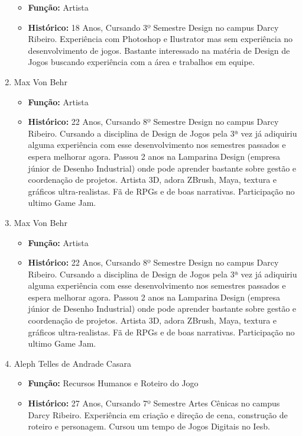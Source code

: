 \documentclass[a4paper, 11pt]{article} %
\begin{document}
\begin{enumerate}
\begin{itemize}
\item \textbf{Função:} Artista
\item \textbf{Histórico:} 18 Anos, Cursando 3º Semestre Design no campus Darcy Ribeiro. Experiência com Photoshop e Ilustrator mas sem experiência no desenvolvimento de jogos. Bastante interessado na matéria de Design de Jogos buscando experiência com a área e trabalhos em equipe.
\end{itemize}

\item Max Von Behr

\begin{itemize}
\item \textbf{Função:} Artista
\item \textbf{Histórico:} 22 Anos, Cursando 8º Semestre Design no campus Darcy Ribeiro. Cursando a disciplina de Design de Jogos pela 3ª vez já adiquiriu alguma experiência com esse desenvolvimento nos semestres passados e espera melhorar agora. Passou 2 anos na Lamparina Design (empresa júnior de Desenho Industrial) onde pode aprender bastante sobre gestão e coordenação de projetos. Artista 3D, adora ZBrush, Maya, textura e gráficos ultra-realistas. Fã de RPGs e de boas narrativas. Participação no ultimo Game Jam. 
\end{itemize}

\item Max Von Behr

\begin{itemize}
\item \textbf{Função:} Artista
\item \textbf{Histórico:} 22 Anos, Cursando 8º Semestre Design no campus Darcy Ribeiro. Cursando a disciplina de Design de Jogos pela 3ª vez já adiquiriu alguma experiência com esse desenvolvimento nos semestres passados e espera melhorar agora. Passou 2 anos na Lamparina Design (empresa júnior de Desenho Industrial) onde pode aprender bastante sobre gestão e coordenação de projetos. Artista 3D, adora ZBrush, Maya, textura e gráficos ultra-realistas. Fã de RPGs e de boas narrativas. Participação no ultimo Game Jam. 
\end{itemize}

\item Aleph Telles de Andrade Casara

\begin{itemize}
\item \textbf{Função:} Recursos Humanos e Roteiro do Jogo
\item \textbf{Histórico:} 27 Anos, Cursando 7º Semestre Artes Cênicas no campus Darcy Ribeiro. Experiência em criação e direção de cena, construção de roteiro e personagem. Cursou um tempo de Jogos Digitais no Iesb.  
\end{itemize}


\end{enumerate}
\end{document}
